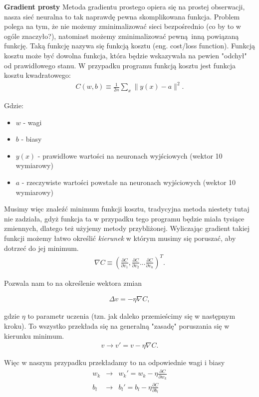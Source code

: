 \documentclass{article}
\begin{document}
\textbf{Gradient prosty} 
Metoda gradientu prostego opiera się na prostej obserwacji, nasza sieć neuralna to tak naprawdę pewna skomplikowana funkcja. Problem polega na tym, że 
nie możemy zminimalizować sieci bezpośrednio (co by to w ogóle znaczyło?), natomiast możemy zminimalizować pewną inną powiązaną funkcję. Taką funkcję
nazywa się funkcją kosztu (eng. cost/loss function). Funkcją kosztu może być dowolna funkcja, która będzie wskazywała na pewien "odchył" od prawidłowego stanu.
\newline
W przypadku programu funkcją kosztu jest funkcja kosztu kwadratowego:
\begin{eqnarray}  
    C(w,b) \equiv \frac{1}{2n} \sum_x \| y(x) - a\|^2.
\end{eqnarray}

Gdzie:
\begin{itemize}
    \item $w$ - wagi
    \item $b$ - biasy
    \item $y(x)$ - prawidłowe wartości na neuronach wyjściowych (wektor 10 wymiarowy)
    \item $a$ - rzeczywiste wartości powstałe na neuronach wyjściowych (wektor 10 wymiarowy) 
\end{itemize}
Musimy więc znaleźć minimum funkcji kosztu, tradycyjna metoda niestety tutaj nie zadziała, gdyż funkcja ta w przypadku tego programu będzie miała tysiące zmiennych,
dlatego też użyjemy metody przybliżonej. Wyliczając gradient takiej funkcji możemy łatwo określić \textit{kierunek} w którym musimy się poruszać, aby dotrzeć do jej minimum.
\begin{eqnarray} 
    \nabla C \equiv \left( \frac{\partial C}{\partial v_1}, 
    \frac{\partial C}{\partial v_2} ... \frac{\partial C}{\partial v_n} \right)^T.
\end{eqnarray}

\pagebreak
Pozwala nam to na określenie wektora zmian

\begin{eqnarray} 
    \Delta v = -\eta \nabla C,
\end{eqnarray}

gdzie $\eta$ to parametr uczenia (tzn. jak daleko przemieścimy się w następnym kroku). To wszystko przekłada się na generalną "zasadę" poruszania się w kierunku minimum.
\begin{eqnarray}
    v \rightarrow v' = v-\eta \nabla C.
\end{eqnarray}

Więc w naszym przypadku przekładamy to na odpowiednie wagi i biasy 
\begin{eqnarray}
    w_k & \rightarrow & w_k' = w_k-\eta \frac{\partial C}{\partial w_k} \\
    b_l & \rightarrow & b_l' = b_l-\eta \frac{\partial C}{\partial b_l}
\end{eqnarray}
\end{document}
